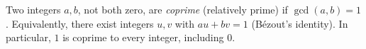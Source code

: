 
Two integers $a,b$, not both zero, are \emph{coprime} (relatively prime) if $\gcd(a,b)=1$. Equivalently, there exist integers $u,v$ with $au+bv=1$ (Bézout's identity). In particular, $1$ is coprime to every integer, including $0$.
